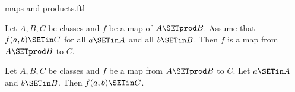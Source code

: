 \documentclass{stex}
\begin{document}
\begin{smodule}{maps-and-products.ftl}

\begin{proposition}[forthel,id=FOUNDATIONS_06_2754759509409792]
  Let $A, B, C$ be classes and $f$ be a map of $A \SETprod B$.
  Assume that $f(a,b) \SETin C$ for all $a \SETin A$ and all $b \SETin B$.
  Then $f$ is a map from $A \SETprod B$ to $C$.
\end{proposition}

\begin{proposition}[forthel,id=FOUNDATIONS_06_2304295212941312]
  Let $A, B, C$ be classes and $f$ be a map from $A \SETprod B$ to $C$.
  Let $a \SETin A$ and $b \SETin B$.
  Then $f(a,b) \SETin C$.
\end{proposition}
\end{smodule}
\end{document}
